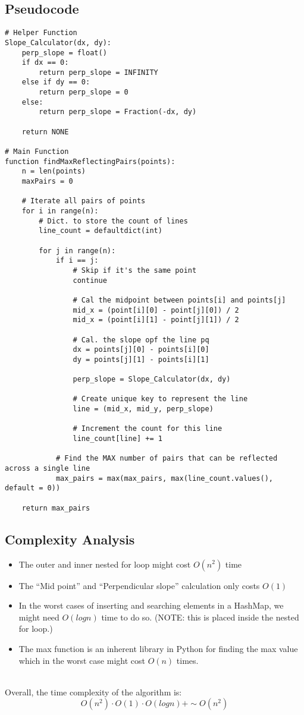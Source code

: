 \documentclass{article}
\begin{document}
\subsection*{Pseudocode}
\begin{verbatim}
# Helper Function
Slope_Calculator(dx, dy):
    perp_slope = float()
    if dx == 0:
        return perp_slope = INFINITY
    else if dy == 0:
        return perp_slope = 0
    else:
        return perp_slope = Fraction(-dx, dy)

    return NONE

# Main Function
function findMaxReflectingPairs(points):
    n = len(points)
    maxPairs = 0

    # Iterate all pairs of points
    for i in range(n):
        # Dict. to store the count of lines
        line_count = defaultdict(int)

        for j in range(n):
            if i == j:
                # Skip if it's the same point
                continue 

                # Cal the midpoint between points[i] and points[j]
                mid_x = (point[i][0] - point[j][0]) / 2
                mid_x = (point[i][1] - point[j][1]) / 2

                # Cal. the slope opf the line pq
                dx = points[j][0] - points[i][0]
                dy = points[j][1] - points[i][1]

                perp_slope = Slope_Calculator(dx, dy)

                # Create unique key to represent the line
                line = (mid_x, mid_y, perp_slope)

                # Increment the count for this line
                line_count[line] += 1

            # Find the MAX number of pairs that can be reflected across a single line
            max_pairs = max(max_pairs, max(line_count.values(), default = 0))

    return max_pairs

\end{verbatim}

\subsection*{Complexity Analysis}
\begin{itemize}
    \item The outer and inner nested for loop might cost $O(n^2)$ time 
    \item The ``Mid point'' and ``Perpendicular slope'' calculation only costs $O(1)$ 
    \item In the worst cases of inserting and searching elements in a HashMap, we might need $O(logn)$ time to do so. (NOTE: this is placed inside the nested for loop.)
    \item The max function is an inherent library in Python for finding the max value which in the worst case might cost $O(n)$ times.
\end{itemize}
\\
Overall, the time complexity of the algorithm is:
\[ O(n^2) \cdot O(1) \cdot O(logn) +  \sim O(n^2) \]
\end{document}
